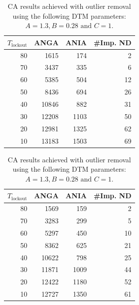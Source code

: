 \begin{table}[h]
\centering
\begin{subtable}[h]{0.45\textwidth}
\begin{tabular}{rrrr}
\hline
 $T_{\text{lockout}}$ & ANGA  & ANIA & \#Imp. ND  \\ \hline
 80                   & 1615  & 174  & 2          \\
 70                   & 3437  & 335  & 6          \\
 60                   & 5385  & 504  & 12         \\
 50                   & 8436  & 694  & 26         \\
 40                   & 10846 & 882  & 31         \\
 30                   & 12208 & 1103 & 50         \\
 20                   & 12981 & 1325 & 62         \\
 10                   & 13183 & 1503 & 69         
 \end{tabular}
 \caption{Without reference cutoff.}
 \label{tab:CA-outliers-removed-without-cutoff}
\end{subtable}
\hfill
\begin{subtable}[h]{0.45\textwidth}
\centering
\begin{tabular}{rrrr}
\hline
 $T_{\text{lockout}}$ & ANGA  & ANIA & \#Imp. ND \\ \hline
 80                   & 1569  & 159  & 2         \\
 70                   & 3283  & 299  & 5         \\
 60                   & 5297  & 450  & 10        \\
 50                   & 8362  & 625  & 21        \\
 40                   & 10622 & 798  & 25        \\
 30                   & 11871 & 1009 & 44        \\
 20                   & 12422 & 1180 & 52        \\
 10                   & 12727 & 1350 & 61       
\end{tabular}
\caption{With reference cutoff.}
\label{tab:CA-outliers-removed-with-cutoff}
\end{subtable}
\caption{CA results achieved with outlier removal using the following DTM parameters: $A= 1.3, B = 0.28 \text{ and } C=1$.}
\label{tab:CA-outliers-removed}
\end{table}

